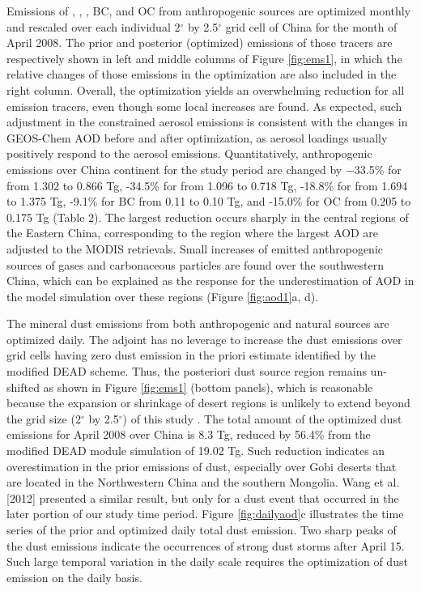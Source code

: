  Emissions of , , , BC, and OC from anthropogenic sources
 are optimized monthly and rescaled over each individual
 2$^{\circ}$ by 2.5$^{\circ}$ grid cell of China for the month of April 2008.
 The prior and posterior (optimized) emissions of those tracers
 are respectively shown in left and middle columns of Figure \ref{fig:ems1},
 in which the relative changes of those emissions in the optimization
 are also included in the right column. Overall, the optimization yields
 an overwhelming reduction for all emission tracers,
 even though some local increases are found.
 As expected, such adjustment in the constrained aerosol emissions
 is consistent with the changes in GEOS-Chem AOD before and after optimization,
 as aerosol loadings usually positively respond to the aerosol emissions.
 Quantitatively, anthropogenic emissions over China continent for the study period
 are changed by $-$33.5\% for  from 1.302 to 0.866 Tg, -34.5\% for  from 1.096 to 0.718 Tg,
 -18.8\% for  from 1.694 to 1.375 Tg, -9.1\% for BC from 0.11 to 0.10 Tg,
 and -15.0\% for OC from 0.205 to 0.175 Tg (Table 2).
 The largest reduction occurs sharply in the central regions of the Eastern China,
 corresponding to the region where the largest AOD are adjusted to the MODIS retrievals.
 Small increases of emitted anthropogenic sources of gases and carbonaceous particles
 are found over the southwestern China, which can be explained
 as the response for the underestimation of AOD in the model simulation over these regions
 (Figure \ref{fig:aod1}a, d). 

 The mineral dust emissions from both anthropogenic and natural sources are optimized daily.
 The adjoint has no leverage to increase the dust emissions over grid cells
 having zero dust emission in the priori estimate identified by the modified DEAD scheme.
 Thus, the posteriori dust source region remains un-shifted as shown
 in Figure \ref{fig:ems1} (bottom panels), which is reasonable
 because the expansion or shrinkage of desert regions is unlikely to extend beyond
 the grid size (2$^{\circ}$ by 2.5$^{\circ}$) of this study \citep{zender03a,fairlie07}.
 The total amount of the optimized dust emissions for April 2008 over China is 8.3 Tg,
 reduced by 56.4\% from the modified DEAD module simulation of 19.02 Tg.
 Such reduction indicates an overestimation in the prior emissions of dust,
 especially over Gobi deserts that are located in the Northwestern China and the southern Mongolia.
 Wang et al. [2012] presented a similar result,
 but only for a dust event that occurred in the later portion of our study time period.
 Figure \ref{fig:dailyaod}c illustrates the time series of the prior and optimized
 daily total dust emission.
 Two sharp peaks of the dust emissions indicate the occurrences of strong dust storms
 after April 15. Such large temporal variation in the daily scale
 requires the optimization of dust emission on the daily basis. 

